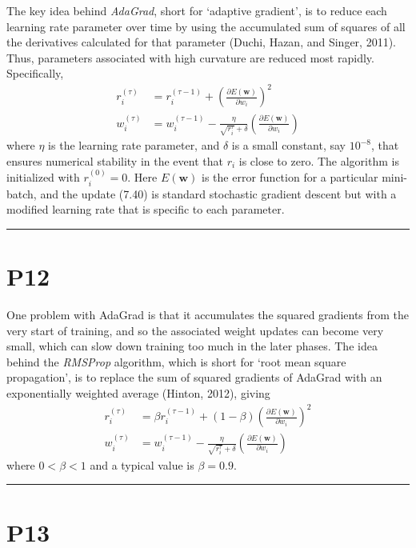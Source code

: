 \documentclass{article}
\begin{document}
The key idea behind \emph{AdaGrad}, short for `adaptive gradient', is to reduce each learning rate parameter over time by using the accumulated sum of squares of all the derivatives calculated for that parameter (Duchi, Hazan, and Singer, 2011). Thus, parameters associated with high curvature are reduced most rapidly. Specifically,
\begin{align}
r_i^{(\tau)} &= r_i^{(\tau-1)} + \left(\frac{\partial E(\mathbf{w})}{\partial w_i}\right)^2 \tag{7.39} \\
w_i^{(\tau)} &= w_i^{(\tau-1)} - \frac{\eta}{\sqrt{r_i^{\tau}} + \delta} \left(\frac{\partial E(\mathbf{w})}{\partial w_i}\right) \tag{7.40}
\end{align}
where $\eta$ is the learning rate parameter, and $\delta$ is a small constant, say $10^{-8}$, that ensures numerical stability in the event that $r_i$ is close to zero. The algorithm is initialized with $r_i^{(0)} = 0$. Here $E(\mathbf{w})$ is the error function for a particular mini-batch, and the update (7.40) is standard stochastic gradient descent but with a modified learning rate that is specific to each parameter.

\noindent\rule{\linewidth}{0.4pt}

\section{P12}

One problem with AdaGrad is that it accumulates the squared gradients from the very start of training, and so the associated weight updates can become very small, which can slow down training too much in the later phases. The idea behind the \emph{RMSProp} algorithm, which is short for `root mean square propagation', is to replace the sum of squared gradients of AdaGrad with an exponentially weighted average (Hinton, 2012), giving
\begin{align}
r_i^{(\tau)} &= \beta r_i^{(\tau-1)} + (1 - \beta) \left(\frac{\partial E(\mathbf{w})}{\partial w_i}\right)^2 \tag{7.41} \\
w_i^{(\tau)} &= w_i^{(\tau-1)} - \frac{\eta}{\sqrt{r_i^{\tau}} + \delta} \left(\frac{\partial E(\mathbf{w})}{\partial w_i}\right) \tag{7.42}
\end{align}
where $0 < \beta < 1$ and a typical value is $\beta = 0.9$.

\noindent\rule{\linewidth}{0.4pt}

\section{P13}
\end{document}
